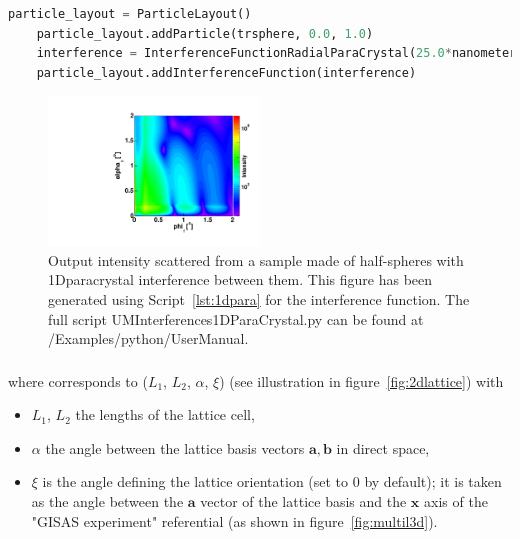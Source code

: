 \begin{lstlisting}[language=python, style=eclipseboxed,numbers=none,nolol,caption={\Code{Python} script to define the radial paracrystal interference function between half-spheres, where \Code{trsphere} is of type \Code{Particle}.},label={lst:1dpara}]
    particle_layout = ParticleLayout()
    particle_layout.addParticle(trsphere, 0.0, 1.0)
    interference = InterferenceFunctionRadialParaCrystal(25.0*nanometer, 7*nanometer, 1e3*nanometer)
    particle_layout.addInterferenceFunction(interference)
\end{lstlisting}

\begin{figure}[ht]
\begin{center}
\includegraphics[width=0.5\textwidth]{Figures/HSphere_1DDL}
\end{center}
\caption{Output intensity scattered from a sample made of half-spheres with 1Dparacrystal interference between them. This figure has been generated using Script~\ref{lst:1dpara} for the interference function. The full script UMInterferences1DParaCrystal.py can be found at /Examples/python/UserManual.}
\label{fig:1ddl}
\end{figure}

\FloatBarrier

\newpage{\cleardoublepage}
\subsubsection{  } \label{paragraph2dlatt}
where  corresponds to ($L_1$, $L_2$, $\alpha$, $\xi$)  (see illustration in figure~\ref{fig:2dlattice}) with 
\begin{itemize}
\item[]$L_1$, $L_2$ the lengths of the lattice cell, 
\item[]$\alpha$ the angle between the lattice basis vectors $\mathbf{a}, \mathbf{b}$ in direct space,
\item[] $\xi$ is the angle defining the lattice orientation (set to $0$ by default); it is taken as the angle between the $\mathbf{a}$ vector of the lattice basis and the $\mathbf{x}$ axis of the "GISAS experiment" referential (as shown in figure~\ref{fig:multil3d}).
\end{itemize}

